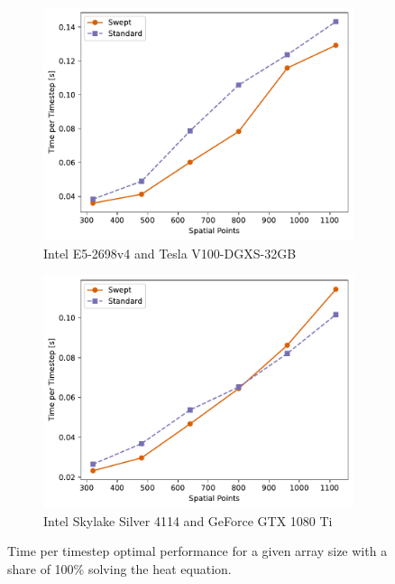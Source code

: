 \documentclass[mca,article,submit,moreauthors,pdftex]{Definitions/mdpi}
\def\oldCPU{Intel Skylake Silver 4114} %
\def\oldGPU{GeForce GTX 1080 Ti}
\def\newCPU{Intel E5-2698v4} %
\def\newGPU{Tesla V100-DGXS-32GB}
\begin{document}
\begin{figure}[htbp]
    \widefigure
    \begin{subfigure}[b]{0.45\textwidth}
        \widefigure
        \includegraphics[scale=0.55]{figs/maxNewheat.pdf}
        \caption{\newCPU{} and \newGPU{}}
        \label{fig:MaxCasesHeatNew}
    \end{subfigure}
    \begin{subfigure}[b]{0.5\textwidth}
        \widefigure
        \includegraphics[scale=0.55]{figs/maxOldheat.pdf}
        \caption{\oldCPU{} and \oldGPU{}}
        \label{fig:MaxCasesHeatOld}
    \end{subfigure}
    \caption{Time per timestep optimal performance for a given array size with a share of 100\%  solving the heat equation.}
    \label{fig:max-heat}
\end{figure}
\end{document}
